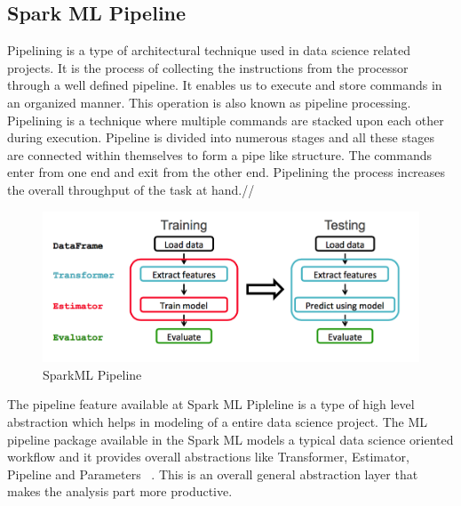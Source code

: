 \subsection{Spark ML Pipeline}
Pipelining is a type of architectural technique used in data science related 
projects. It is the process of collecting the instructions from the processor 
through a well defined pipeline. It enables us to execute and store 
commands in an organized manner. This operation is also known as pipeline 
processing. Pipelining is a technique where multiple commands are 
stacked upon each other during execution. Pipeline is divided into numerous 
stages and all these stages are connected within themselves to form a pipe 
like structure. The commands enter from one end and exit from the other end. 
Pipelining the process increases the overall throughput of the task at hand.//

\begin{figure}[!ht]
\centering\includegraphics[width=\columnwidth]{images/spark_pipeline.png}
\caption{SparkML Pipeline~\cite{hid-sp18-418-spark-pipeline}}
\label{f:Pipeline in SparkML}
\end{figure}

The pipeline feature available at Spark ML Pipleline is a type of high 
level abstraction which helps in modeling of a entire data science project.
 The ML pipeline package available in the Spark ML models a typical 
 data science oriented workflow and it provides overall abstractions 
 like Transformer, Estimator, Pipeline and Parameters ~\cite{hid-sp18-418-spark}. 
 This is an overall general abstraction layer that makes the analysis 
 part more productive.

